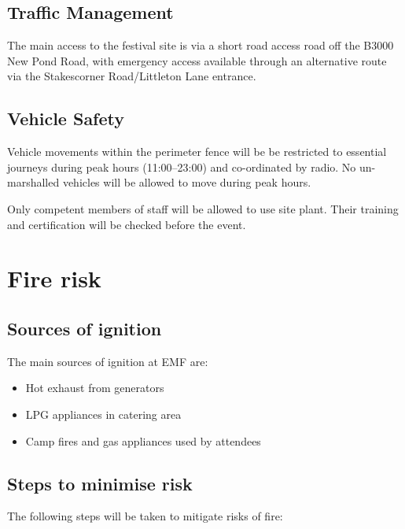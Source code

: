 \subsection{Traffic Management}

The main access to the festival site is via a short road access road off the B3000 New Pond Road, with emergency access available
through an alternative route via the Stakescorner Road/Littleton Lane entrance.

\subsection{Vehicle Safety}

Vehicle movements within the perimeter fence will be be restricted to essential journeys during peak hours (11:00--23:00) and co-ordinated by radio. No un-marshalled vehicles will be allowed to move during peak hours.

Only competent members of staff will be allowed to use site plant. Their training and certification will be checked before the event.

\section{Fire risk}
\subsection{Sources of ignition}

The main sources of ignition at EMF are:

\begin{itemize}
\item Hot exhaust from generators
\item LPG appliances in catering area
\item Camp fires and gas appliances used by attendees
\end{itemize}

\subsection{Steps to minimise risk}
The following steps will be taken to mitigate risks of fire:

